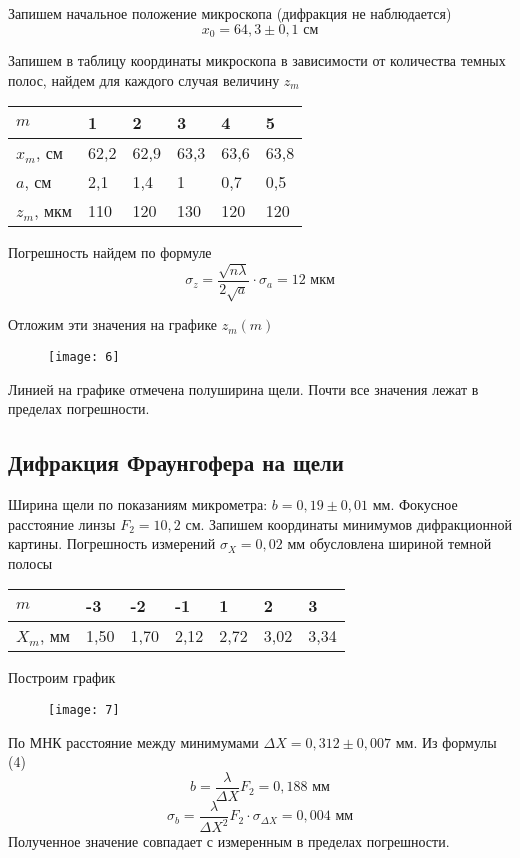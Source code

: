 	Запишем начальное положение микроскопа (дифракция не наблюдается)
	\[
		x_0 = 64,3\pm0,1 \text{ см}
	\]
	
	Запишем в таблицу координаты микроскопа в зависимости от количества темных полос, найдем для каждого случая величину $z_m$
	\begin{table}[H]
		\centering
		\begin{tabular}{|l|l|l|l|l|l|}
			\hline
			$m$        & 1    & 2    & 3    & 4    & 5    \\ \hline
			$x_m$, см  & 62,2 & 62,9 & 63,3 & 63,6 & 63,8 \\ \hline
			$a$, см    & 2,1  & 1,4  & 1    & 0,7  & 0,5  \\ \hline
			$z_m$, мкм & 110  & 120  & 130  & 120  & 120  \\ \hline
		\end{tabular}
	\end{table}
	Погрешность найдем по формуле
	\[
		\sigma_z = \frac{\sqrt{n\lambda}}{2\sqrt{a}}\cdot\sigma_a = 12\text{ мкм}
	\]
	
	Отложим эти значения на графике $z_m(m)$
	\begin{figure}[H]
		\centering
		\texttt{[image: 6]}
	\end{figure}
	Линией на графике отмечена полуширина щели. Почти все значения лежат в пределах погрешности.
	
	\subsection{Дифракция Фраунгофера на щели}
	
	Ширина щели по показаниям микрометра: $b = 0,19\pm 0,01$ мм. Фокусное расстояние линзы $F_2 = 10,2 $ см. Запишем координаты минимумов дифракционной картины. Погрешность измерений $\sigma_X = 0,02$ мм обусловлена шириной темной полосы
	\begin{table}[H]
		\centering
		\begin{tabular}{|l|l|l|l|l|l|l|}
			\hline
			$m$       & -3   & -2   & -1   & 1    & 2    & 3    \\ \hline
			$X_m$, мм & 1,50 & 1,70 & 2,12 & 2,72 & 3,02 & 3,34 \\ \hline
		\end{tabular}
	\end{table}

	Построим график
	\begin{figure}[H]
		\centering
		\texttt{[image: 7]}
	\end{figure}
	По МНК расстояние между минимумами $\Delta X = 0,312 \pm 0,007$ мм. Из формулы (4)
	\[
		b = \frac{\lambda}{\Delta X}F_2 = 0,188 \text{ мм}
	\]
	\[
		\sigma_b = \frac{\lambda}{\Delta X^2}F_2\cdot \sigma_{\Delta X} = 0,004 \text{ мм}
	\]
	Полученное значение совпадает с измеренным в пределах погрешности.


